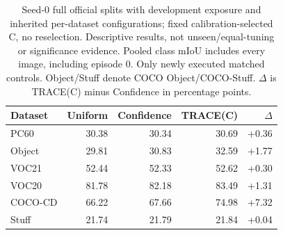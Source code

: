 \begin{table}[t]
\caption{Seed-0 full official splits with development exposure and inherited per-dataset configurations; fixed calibration-selected C, no reselection. Descriptive results, not unseen/equal-tuning or significance evidence. Pooled class mIoU includes every image, including episode 0. Only newly executed matched controls. Object/Stuff denote COCO Object/COCO-Stuff. $\Delta$ is TRACE(C) minus Confidence in percentage points.}
\label{tab:image-full-comparison}
\centering\small\setlength{\tabcolsep}{4pt}
\begin{tabular}{@{}lrrrr@{}}
\toprule
Dataset & Uniform & Confidence & TRACE(C) & $\Delta$ \\
\midrule
PC60 & 30.38 & 30.34 & 30.69 & +0.36 \\
Object & 29.81 & 30.83 & 32.59 & +1.77 \\
VOC21 & 52.44 & 52.33 & 52.62 & +0.30 \\
VOC20 & 81.78 & 82.18 & 83.49 & +1.31 \\
COCO-CD & 66.22 & 67.66 & 74.98 & +7.32 \\
Stuff & 21.74 & 21.79 & 21.84 & +0.04 \\
\bottomrule
\end{tabular}
\end{table}
